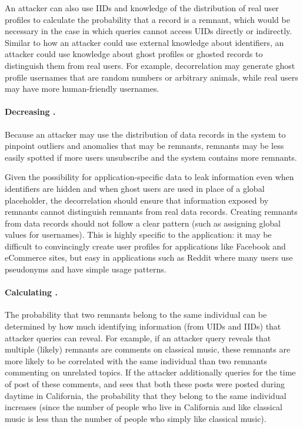 An attacker can also use IIDs and knowledge of the distribution of real user profiles to calculate the
probability that a record is a remnant, which would be necessary in the case in which queries cannot
access UIDs directly or indirectly. Similar to how an attacker could use external knowledge about
identifiers, an attacker could use knowledge about ghost profiles or ghosted records to distinguish
them from real users.  For example, decorrelation may generate ghost profile usernames that are
random numbers or arbitrary animals, while real users may have more human-friendly usernames.

\paragraph{Decreasing \premnant{}.}
Because an attacker may use the distribution of data records in the system to pinpoint outliers and
anomalies that may be remnants, remnants may be less easily spotted if more users unsubscribe and
the system contains more remnants. 

Given the possibility for application-specific data to leak information even when identifiers are
hidden and when ghost users are used in place of a global placeholder, the decorrelation should
ensure that information exposed by remnants cannot distinguish remnants from real data records.
Creating remnants from data records should not follow a clear pattern (such as assigning global
values for usernames).  This is highly specific to the application: it may be difficult to
convincingly create user profiles for applications like Facebook and eCommerce sites, but easy in
applications such as Reddit where many users use pseudonyms and have simple usage patterns.

\paragraph{Calculating \plinked{}.}
The probability that two remnants belong to the same individual can be determined by how much
identifying information (from UIDs and IIDs) that attacker queries can reveal.
For example, if an attacker query reveals that multiple
(likely) remnants are comments on classical music, these remnants are more likely to be
correlated with the same individual than two remnants commenting on unrelated topics. If the
attacker additionally queries for the time of post of these comments, and sees that both these posts
were posted during daytime in California, the probability that they belong to the same individual
increases (since the number of people who live in California and like classical music is less than
the number of people who simply like classical music).

